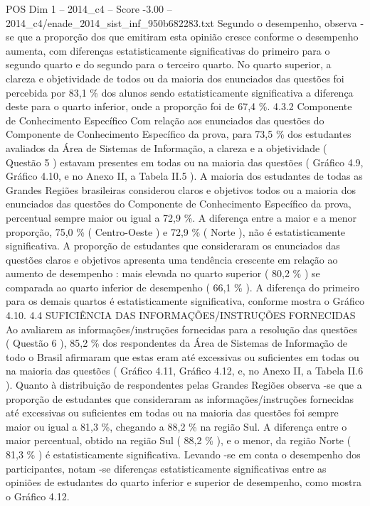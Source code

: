 \begin{textsample}{POS Dim 1 – 2014\_c4 – Score -3.00 – 2014\_c4/enade\_2014\_sist\_inf\_950b682283.txt}
Segundo o desempenho, observa -se que a proporção dos que emitiram esta opinião cresce conforme o desempenho aumenta, com diferenças estatisticamente significativas do primeiro para o segundo quarto e do segundo para o terceiro quarto.
No quarto superior, a clareza e objetividade de todos ou da maioria dos enunciados das questões foi percebida por 83,1 \% dos alunos sendo estatisticamente significativa a diferença deste para o quarto inferior, onde a proporção foi de 67,4 \%. 4.3.2 Componente de Conhecimento Específico Com relação aos enunciados das questões do Componente de Conhecimento Específico da prova, para 73,5 \% dos estudantes avaliados da Área de Sistemas de Informação, a clareza e a objetividade ( Questão 5 ) estavam presentes em todas ou na maioria das questões ( Gráfico 4.9, Gráfico 4.10, e no Anexo II, a Tabela II.5 ).
A maioria dos estudantes de todas as Grandes Regiões brasileiras considerou claros e objetivos todos ou a maioria dos enunciados das questões do Componente de Conhecimento Específico da prova, percentual sempre maior ou igual a 72,9 \%.
A diferença entre a maior e a menor proporção, 75,0 \% ( Centro-Oeste ) e 72,9 \% ( Norte ), não é estatisticamente significativa.
A proporção de estudantes que consideraram os enunciados das questões claros e objetivos apresenta uma tendência crescente em relação ao aumento de desempenho : mais elevada no quarto superior ( 80,2 \% ) se comparada ao quarto inferior de desempenho ( 66,1 \% ).
A diferença do primeiro para os demais quartos é estatisticamente significativa, conforme mostra o Gráfico 4.10. 4.4 SUFICIÊNCIA DAS INFORMAÇÕES/INSTRUÇÕES FORNECIDAS Ao avaliarem as informações/instruções fornecidas para a resolução das questões ( Questão 6 ), 85,2 \% dos respondentes da Área de Sistemas de Informação de todo o Brasil afirmaram que estas eram até excessivas ou suficientes em todas ou na maioria das questões ( Gráfico 4.11, Gráfico 4.12, e, no Anexo II, a Tabela II.6 ).
Quanto à distribuição de respondentes pelas Grandes Regiões observa -se que a proporção de estudantes que consideraram as informações/instruções fornecidas até excessivas ou suficientes em todas ou na maioria das questões foi sempre maior ou igual a 81,3 \%, chegando a 88,2 \% na região Sul.
A diferença entre o maior percentual, obtido na região Sul ( 88,2 \% ), e o menor, da região Norte ( 81,3 \% ) é estatisticamente significativa.
Levando -se em conta o desempenho dos participantes, notam -se diferenças estatisticamente significativas entre as opiniões de estudantes do quarto inferior e superior de desempenho, como mostra o Gráfico 4.12.

\end{textsample}
